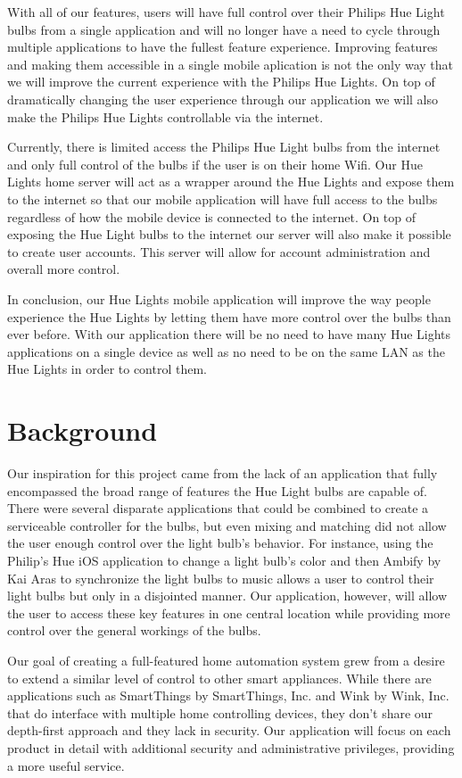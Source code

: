 \documentclass[12pt]{article}
\begin{document}
With all of our features, users will have full control over their Philips Hue Light bulbs from a single application and will no longer have a need to cycle through multiple applications to have the fullest feature experience.  Improving features and making them accessible in a single mobile aplication is not the only way that we will improve the current experience with the Philips Hue Lights.  On top of dramatically changing the user experience through our application we will also make the Philips Hue Lights controllable via the internet.

Currently, there is limited access the Philips Hue Light bulbs from the internet and only full control of the bulbs if the user is on their home Wifi.   Our Hue Lights home server will act as a wrapper around the Hue Lights and expose them to the internet so that our mobile application will have full access to the bulbs regardless of how the mobile device is connected to the internet.  On top of exposing the Hue Light bulbs to the internet our server will also make it possible to create user accounts.  This server will allow for account administration and overall more control.

In conclusion, our Hue Lights mobile application will improve the way people experience the Hue Lights by letting them have more control over the bulbs than ever before.  With our application there will be no need to have many Hue Lights applications on a single device as well as no need to be on the same LAN as the Hue Lights in order to control them. 
\section{Background}
Our inspiration for this project came from the lack of an application that fully encompassed the broad range of features the Hue Light bulbs are capable of. There were several disparate applications that could be combined to create a serviceable controller for the bulbs, but even mixing and matching did not allow the user enough control over the light bulb's behavior. For instance, using the Philip's Hue iOS application to change a light bulb's color and then Ambify by Kai Aras to synchronize the light bulbs to music allows a user to control their light bulbs but only in a disjointed manner. Our application, however, will allow the user to access these key features in one central location while providing more control over the general workings of the bulbs.

Our goal of creating a full-featured home automation system grew from a desire to extend a similar level of control to other smart appliances. While there are applications such as SmartThings by SmartThings, Inc. and Wink by Wink, Inc. that do interface with multiple home controlling devices, they don't share our depth-first approach and they lack in security. Our application will focus on each product in detail with additional security and administrative privileges, providing a more useful service.
\end{document}
